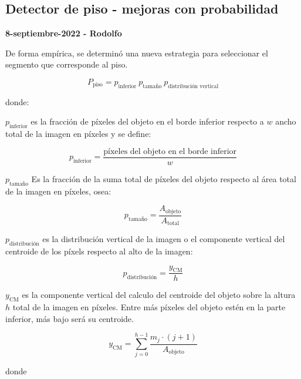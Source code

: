 \subsection*{Detector de piso - mejoras con probabilidad}

\textbf{8-septiembre-2022 - Rodolfo}

De forma empírica, se determinó una nueva estrategia para seleccionar el segmento que corresponde al piso.


\begin{equation}
    P_{\text{piso}} = p_\text{{inferior}}\ p_\text{{tamaño}} \ p_\text{{distribución \ vertical}}    
\end{equation}

\noindent donde:

$p_\text{{inferior}} $ es la fracción de píxeles del objeto en el borde inferior respecto a $w$ ancho total de la imagen en píxeles y se define:

\begin{equation}
    p_\text{{inferior}} = \frac{\text{píxeles del objeto en el borde inferior}}{w}
\end{equation}


$p_\text{{tamaño}}$ Es la fracción de la suma total de píxeles del objeto respecto al área total de la imagen en píxeles, osea:

\begin{equation}
p_\text{{tamaño}} = \frac{A_{\text{objeto}}}{A_{\text{total}}}
\end{equation}

$p_\text{{distribución}}$ es la distribución vertical de la imagen o el componente vertical del centroide de los píxels respecto al alto de la imagen:



\begin{equation}
p_\text{{distribución}} = \frac{y_{\text{CM}}}{h}
\end{equation}

$y_{\text{CM}}$ es la componente vertical del calculo del centroide del objeto sobre la altura $h$ total de la imagen en píxeles. Entre más píxeles del objeto estén en la parte inferior, más bajo será su centroide.



\begin{equation}
    y_{\text{CM}} = \sum_{j=0}^{h-1}\frac{m_j \cdot (j+1)}{A_{\text{objeto}}}
\end{equation}

donde

